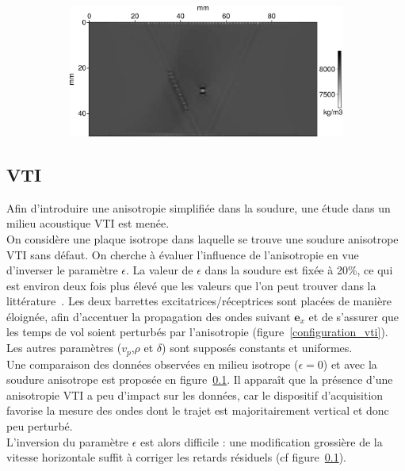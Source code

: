 \begin{figure}[!h]
\begin{subfigure}[b]{0.45\textwidth}
		\includegraphics[width=\textwidth]{img/multi_param/rho_6000k.png}
		\caption{}
	\end{subfigure}
	\caption{\label{app:inv_multi} }
\end{figure}


\subsection{VTI}
Afin d'introduire une anisotropie simplifiée dans la soudure, une étude dans un milieu acoustique VTI est menée.\\

On considère une plaque isotrope dans laquelle se trouve une soudure anisotrope VTI sans défaut. On cherche à évaluer l'influence de l'anisotropie en vue d'inverser le paramètre $\epsilon$. La valeur de $\epsilon$ dans la soudure est fixée à 20\%, ce qui est environ deux fois plus élevé que les valeurs que l'on peut trouver dans la littérature~\citep{chassignole}. Les deux barrettes excitatrices/réceptrices sont placées de manière éloignée, afin d'accentuer la propagation des ondes suivant $\bm{e}_{x}$ et de s'assurer que les temps de vol soient perturbés par l'anisotropie (figure~\ref{configuration_vti}).\\
Les autres paramètres ($v_{p}$,$\rho$ et $\delta$) sont supposés constants et uniformes.\\

Une comparaison des données observées en milieu isotrope ($\epsilon = 0$) et avec la soudure anisotrope est proposée en figure~\ref{}. Il apparaît que la présence d'une anisotropie VTI a peu d'impact sur les données, car le dispositif d'acquisition favorise la mesure des ondes dont le trajet est majoritairement vertical et donc peu perturbé.\\
 L'inversion du paramètre $\epsilon$ est alors difficile : une modification grossière de la vitesse horizontale suffit à corriger les retards résiduels (cf figure~\ref{}).
 
